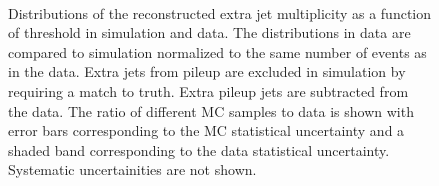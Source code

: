 \begin{figure}
\centering
{}
\\
\caption{Distributions of the reconstructed extra jet multiplicity as a function of \pt threshold in simulation and data. The distributions in data are compared to \ttbar simulation normalized to the same number of events as in the data. Extra jets from pileup are excluded in simulation by requiring a match to truth. Extra pileup jets are subtracted from the data. The ratio of different MC samples to data is shown with error bars corresponding to the MC statistical uncertainty and a shaded band corresponding to the data statistical uncertainty. Systematic uncertainities are not shown.}
\label{fig:nrecojets}
\end{figure}


